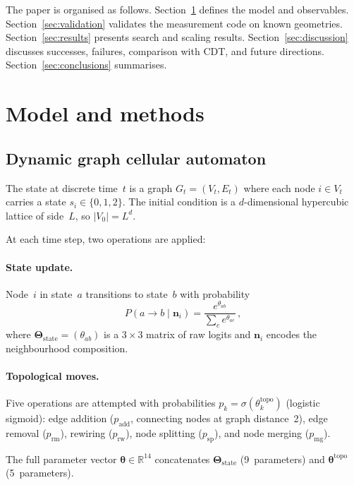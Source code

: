 \documentclass[aps,prd,twocolumn,superscriptaddress,floatfix]{revtex4-2}
\begin{document}
The paper is organised as follows.
Section~\ref{sec:model} defines the model and observables.
Section~\ref{sec:validation} validates the measurement code on
known geometries.
Section~\ref{sec:results} presents search and scaling results.
Section~\ref{sec:discussion} discusses successes, failures,
comparison with CDT, and future directions.
Section~\ref{sec:conclusions} summarises.


\section{Model and methods}
\label{sec:model}

\subsection{Dynamic graph cellular automaton}

The state at discrete time~$t$ is a graph $G_t = (V_t, E_t)$ where
each node $i \in V_t$ carries a state $s_i \in \{0,1,2\}$.  The
initial condition is a $d$-dimensional hypercubic lattice of
side~$L$, so $|V_0| = L^d$.

At each time step, two operations are applied:

\paragraph{State update.}
Node~$i$ in state~$a$ transitions to state~$b$ with probability
\begin{equation}
  P(a \to b \mid \mathbf{n}_i) = \frac{e^{\theta_{ab}}}
    {\sum_{c} e^{\theta_{ac}}} \,,
\end{equation}
where $\boldsymbol{\Theta}_{\mathrm{state}} = (\theta_{ab})$ is a
$3 \times 3$ matrix of raw logits and $\mathbf{n}_i$ encodes the
neighbourhood composition.

\paragraph{Topological moves.}
Five operations are attempted with probabilities
$p_k = \sigma(\theta_k^{\mathrm{topo}})$ (logistic sigmoid):
edge addition ($p_{\mathrm{add}}$, connecting nodes at
graph distance~2),
edge removal ($p_{\mathrm{rm}}$),
rewiring ($p_{\mathrm{rw}}$),
node splitting ($p_{\mathrm{sp}}$), and
node merging ($p_{\mathrm{mg}}$).

The full parameter vector
$\boldsymbol{\theta} \in \mathbb{R}^{14}$ concatenates
$\boldsymbol{\Theta}_{\mathrm{state}}$ (9~parameters) and
$\boldsymbol{\theta}^{\mathrm{topo}}$ (5~parameters).
\end{document}
